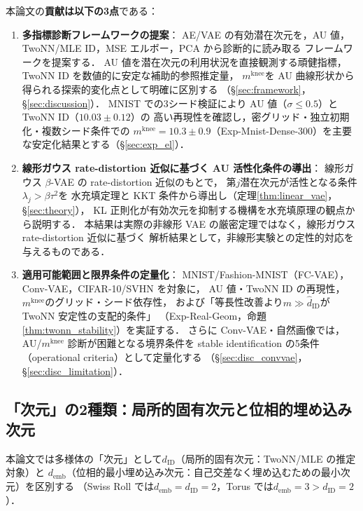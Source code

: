 \documentclass[11pt,a4paper]{jsarticle}
\newcommand{\dID}{d_{\mathrm{ID}}}
\newcommand{\mknee}{m^{\mathrm{knee}}}
\newcommand{\demb}{d_{\mathrm{emb}}}
\begin{document}
本論文の\textbf{貢献は以下の3点}である：
\begin{enumerate}
  \item \textbf{多指標診断フレームワークの提案}：
        AE/VAE の有効潜在次元を，AU 値，TwoNN/MLE ID，MSE エルボー，PCA から診断的に読み取る
        フレームワークを提案する．
        AU 値を潜在次元の利用状況を直接観測する頑健指標，
        TwoNN ID を数値的に安定な補助的参照推定量，
        $\mknee$を AU 曲線形状から得られる探索的変化点として明確に区別する
        （§\ref{sec:framework}，§\ref{sec:discussion}）．
        MNIST での3シード検証により AU 値（$\sigma \leq 0.5$）と TwoNN ID（$10.03 \pm 0.12$）の
        高い再現性を確認し，密グリッド・独立初期化・複数シード条件での
        $\mknee = 10.3 \pm 0.9$（Exp-Mnist-Dense-300）を主要な安定化結果とする（§\ref{sec:exp_el}）．
  \item \textbf{線形ガウス rate-distortion 近似に基づく AU 活性化条件の導出}：
        線形ガウス $\beta$-VAE の rate-distortion 近似のもとで，
        第$j$潜在次元が活性となる条件$\lambda_j > \beta\tau^2$を
        水充填定理と KKT 条件から導出し（定理\ref{thm:linear_vae}，§\ref{sec:theory}），
        KL 正則化が有効次元を抑制する機構を水充填原理の観点から説明する．
        本結果は実際の非線形 VAE の厳密定理ではなく，線形ガウス rate-distortion 近似に基づく
        解析結果として，非線形実験との定性的対応を与えるものである．
  \item \textbf{適用可能範囲と限界条件の定量化}：
        MNIST/Fashion-MNIST（FC-VAE），Conv-VAE，CIFAR-10/SVHN を対象に，
        AU 値・TwoNN ID の再現性，$\mknee$のグリッド・シード依存性，
        および「等長性改善より$m \gg \hat{d}_\mathrm{ID}$が TwoNN 安定性の支配的条件」
        （Exp-Real-Geom，命題\ref{thm:twonn_stability}）を実証する．
        さらに Conv-VAE・自然画像では，AU/$\mknee$ 診断が困難となる境界条件を
        stable identification の5条件（operational criteria）として定量化する
        （§\ref{sec:disc_convvae}，§\ref{sec:disc_limitation}）．
\end{enumerate}

\subsection{「次元」の2種類：局所的固有次元と位相的埋め込み次元}\label{sec:intro_dim}

本論文では多様体の「次元」として$\dID$（局所的固有次元：TwoNN/MLE の推定対象）と
$\demb$（位相的最小埋め込み次元：自己交差なく埋め込むための最小次元）を区別する
（Swiss Roll では$\demb = \dID = 2$，Torus では$\demb = 3 > \dID = 2$）．
\end{document}
